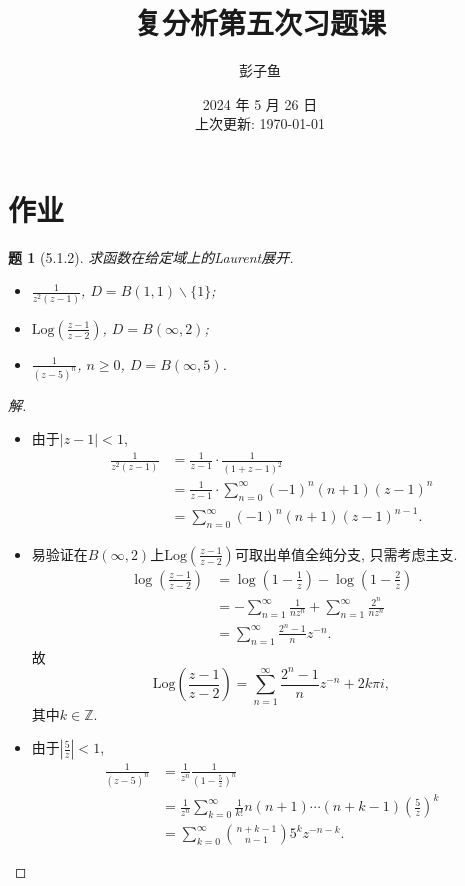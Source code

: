 \documentclass{article}[a4paper, 12pt]
\theoremstyle{mystyle}
\newtheorem{problem}{题}
\newenvironment{solution}{\begin{proof}[解]}{\end{proof}}
\begin{document}
\title{复分析第五次习题课}
\author{彭子鱼}
\date{2024 年 5 月 26 日\\上次更新: \today}

\maketitle

\section{作业}

\begin{problem}[5.1.2]
  求函数在给定域上的Laurent展开.
  \begin{itemize}
    \item[(1)] \(\frac{1}{z^2(z-1)}\), \(D=B(1,1)\backslash\{1\}\);
    \item[(3)] \(\text{Log}\left(\frac{z-1}{z-2}\right)\), \(D=B(\infty,2)\);
    \item[(5)] \(\frac{1}{(z-5)^n}\), \(n\ge0\), \(D=B(\infty,5)\).
  \end{itemize}
\end{problem}

\begin{solution}
  \begin{itemize}
    \item [(1)] 由于\(|z-1|<1\), \[\begin{aligned}
      \frac{1}{z^2(z-1)}&=\frac{1}{z-1}\cdot\frac{1}{(1+z-1)^2}\\
      &=\frac{1}{z-1}\cdot\sum_{n=0}^\infty (-1)^n(n+1)(z-1)^n\\
      &=\sum_{n=0}^\infty (-1)^n(n+1)(z-1)^{n-1}.
    \end{aligned}\]
    \item [(3)] 易验证在\(B(\infty,2)\)上\(\text{Log}\left(\frac{z-1}{z-2}\right)\)可取出单值全纯分支, 只需考虑主支. \[\begin{aligned}
      \log\left(\frac{z-1}{z-2}\right)&=\log\left(1-\frac1z\right)-\log\left(1-\frac2z\right)\\
      &=-\sum_{n=1}^\infty \frac{1}{nz^n}+\sum_{n=1}^\infty\frac{2^n}{nz^n}\\
      &=\sum_{n=1}^\infty \frac{2^n-1}{n}z^{-n}.
    \end{aligned}\]
    故\[\text{Log}\left(\frac{z-1}{z-2}\right)=\sum_{n=1}^\infty \frac{2^n-1}{n}z^{-n}+2k\pi i,\] 其中\(k\in\mathbb{Z}\).
    \item [(5)] 由于\(|\frac{5}{z}|<1\), \begin{align*}
      \frac{1}{(z-5)^n}&=\frac{1}{z^n}\frac{1}{(1-\frac{5}{z})^n}\\
      &=\frac{1}{z^n}\sum_{k=0}^\infty \frac{1}{k!}n(n+1)\cdots(n+k-1)\left(\frac{5}{z}\right)^k\\
      &=\sum_{k=0}^\infty \binom{n+k-1}{n-1}5^kz^{-n-k}. \tag*{\(\qed\)}
    \end{align*}
  \end{itemize}
  \renewcommand{\qedsymbol}{}
\end{solution}
\end{document}
